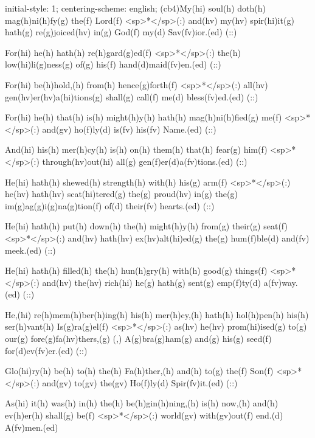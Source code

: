 initial-style: 1;
centering-scheme: english;
(cb4)My(hi) soul(h) doth(h) mag(h)ni(h)fy(g) the(f) Lord(f) <sp>*</sp>(:) and(hv) my(hv) spir(hi)it(g) hath(g) re(g)joiced(hv) in(g) God(f) my(d) Sav(fv)ior.(ed) (::)

For(hi) he(h) hath(h) re(h)gard(g)ed(f) <sp>*</sp>(:) the(h) low(hi)li(g)ness(g) of(g) his(f) hand(d)maid(fv)en.(ed) (::)

For(hi) be(h)hold,(h) from(h) hence(g)forth(f) <sp>*</sp>(:) all(hv) gen(hv)er(hv)a(hi)tions(g) shall(g) call(f) me(d) bless(fv)ed.(ed) (::)

For(hi) he(h) that(h) is(h) might(h)y(h) hath(h) mag(h)ni(h)fied(g) me(f) <sp>*</sp>(:) and(gv) ho(f)ly(d) is(fv) his(fv) Name.(ed) (::)

And(hi) his(h) mer(h)cy(h) is(h) on(h) them(h) that(h) fear(g) him(f) <sp>*</sp>(:) through(hv)out(hi) all(g) gen(f)er(d)a(fv)tions.(ed) (::)

He(hi) hath(h) shewed(h) strength(h) with(h) his(g) arm(f) <sp>*</sp>(:) he(hv) hath(hv) scat(hi)tered(g) the(g) proud(hv) in(g) the(g) im(g)ag(g)i(g)na(g)tion(f) of(d) their(fv) hearts.(ed) (::)

He(hi) hath(h) put(h) down(h) the(h) might(h)y(h) from(g) their(g) seat(f) <sp>*</sp>(:) and(hv) hath(hv) ex(hv)alt(hi)ed(g) the(g) hum(f)ble(d) and(fv) meek.(ed) (::)

He(hi) hath(h) filled(h) the(h) hun(h)gry(h) with(h) good(g) things(f) <sp>*</sp>(:) and(hv) the(hv) rich(hi) he(g) hath(g) sent(g) emp(f)ty(d) a(fv)way.(ed) (::)

He,(hi) re(h)mem(h)ber(h)ing(h) his(h) mer(h)cy,(h) hath(h) hol(h)pen(h) his(h) ser(h)vant(h) Is(g)ra(g)el(f) <sp>*</sp>(:) as(hv) he(hv) prom(hi)ised(g) to(g) our(g) fore(g)fa(hv)thers,(g) (,) A(g)bra(g)ham(g) and(g) his(g) seed(f) for(d)ev(fv)er.(ed) (::)

Glo(hi)ry(h) be(h) to(h) the(h) Fa(h)ther,(h) and(h) to(g) the(f) Son(f) <sp>*</sp>(:) and(gv) to(gv) the(gv) Ho(f)ly(d) Spir(fv)it.(ed) (::)

As(hi) it(h) was(h) in(h) the(h) be(h)gin(h)ning,(h) is(h) now,(h) and(h) ev(h)er(h) shall(g) be(f) <sp>*</sp>(:) world(gv) with(gv)out(f) end.(d) A(fv)men.(ed)
